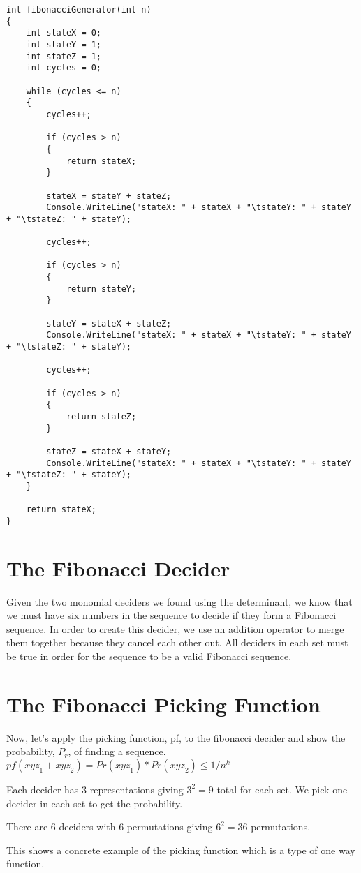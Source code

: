 \begin{lstlisting}
int fibonacciGenerator(int n)
{
    int stateX = 0;
    int stateY = 1;
    int stateZ = 1;
    int cycles = 0;

    while (cycles <= n)
    {
        cycles++;

        if (cycles > n)
        {
            return stateX;
        }

        stateX = stateY + stateZ;
        Console.WriteLine("stateX: " + stateX + "\tstateY: " + stateY + "\tstateZ: " + stateY);
        
        cycles++;

        if (cycles > n)
        {
            return stateY;
        }

        stateY = stateX + stateZ;
        Console.WriteLine("stateX: " + stateX + "\tstateY: " + stateY + "\tstateZ: " + stateY);

        cycles++;

        if (cycles > n)
        {
            return stateZ;
        }

        stateZ = stateX + stateY;
        Console.WriteLine("stateX: " + stateX + "\tstateY: " + stateY + "\tstateZ: " + stateY);
    }

    return stateX;
}
\end{lstlisting}

\section{The Fibonacci Decider}

Given the two monomial deciders we found using the determinant, we know that we must have six numbers in the sequence to decide if they form a Fibonacci sequence. In order to create this decider, we use an addition operator to merge them together because they cancel each other out. All deciders in each set must be true in order for the sequence to be a valid Fibonacci sequence.

\section{The Fibonacci Picking Function}

Now, let's apply the picking function, pf, to the fibonacci decider and show the probability, $P_r$, of finding a sequence. $pf({xyz}_1 + {xyz}_2) = Pr({xyz}_1)*Pr({xyz}_2) \leq 1/n^{k}$

Each decider has 3 representations giving $3^2 = 9$ total for each set. We pick one decider in each set to get the probability.

There are 6 deciders with 6 permutations giving $6^2 = 36$ permutations.

This shows a concrete example of the picking function which is a type of one way function.
